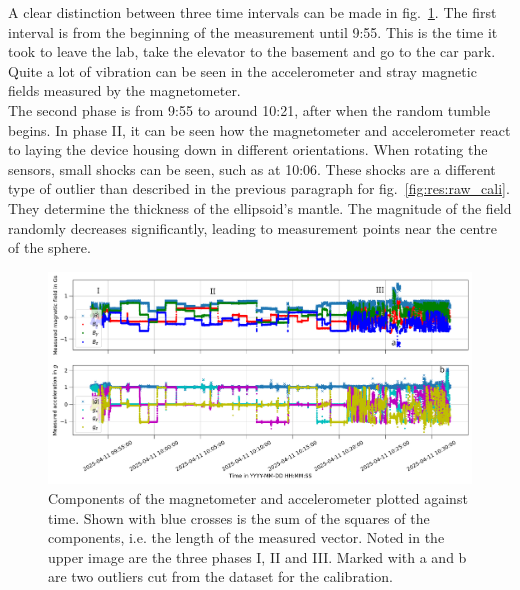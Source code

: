A clear distinction between three time intervals can be made in fig.~\ref{fig:res:raw_cali_vectors}. The first interval is from the beginning of the measurement until 9:55. This is the time it took to leave the lab, take the elevator to the basement and go to the car park. Quite a lot of vibration can be seen in the accelerometer and stray magnetic fields measured by the magnetometer.\\
The second phase is from 9:55 to around 10:21, after when the random tumble begins. In phase II, it can be seen how the magnetometer and accelerometer react to laying the device housing down in different orientations. When rotating the sensors, small shocks can be seen, such as at 10:06. These shocks are a different type of outlier than described in the previous paragraph for fig.~\ref{fig:res:raw_cali}. They determine the thickness of the ellipsoid's mantle. The magnitude of the field randomly decreases significantly, leading to measurement points near the centre of the sphere.

\begin{figure}[H]
    \centering
    \includegraphics[width=\linewidth]{images/04_calibration/raw_vectors-2025-04-11.png}
    \caption[Components of the magnetometer and accelerometer plotted against time.]{Components of the magnetometer and accelerometer plotted against time. Shown with blue crosses is the sum of the squares of the components, i.e. the length of the measured vector. Noted in the upper image are the three phases I, II and III. Marked with a and b are two outliers cut from the dataset for the calibration.}
    \label{fig:res:raw_cali_vectors}
\end{figure}

